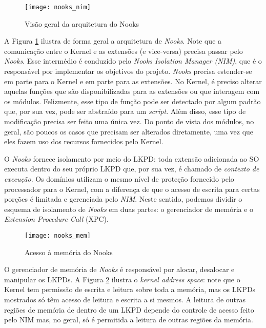 \begin{figure}[!h]
  \centering
  \texttt{[image: nooks\_nim]}
	\caption[Visão geral da arquitetura do Nooks]{Visão geral da arquitetura do Nooks \citep{nooks}}
  \label{fig:nooks_nim}
\end{figure}

A Figura \ref{fig:nooks_nim} ilustra de forma geral a arquitetura de
\emph{Nooks}. Note que a comunicação entre o Kernel e as extensões (e vice-versa)
precisa passar pelo \emph{Nooks}. Esse intermédio é conduzido pelo \emph{Nooks
Isolation Manager (NIM)}, que é o responsável por implementar os objetivos do
projeto. \emph{Nooks} precisa estender-se em parte para o Kernel e em parte
para as extensões. No Kernel, é preciso alterar aquelas funções que são
disponibilizadas para as extensões ou que interagem com os módulos. Felizmente,
esse tipo de função pode ser detectado por algum padrão que, por sua vez, pode
ser abstraído para um \emph{script}. Além disso, esse tipo de modificação precisa ser
feito uma única vez. Do ponto de vista dos módulos, no geral, são poucos os
casos que precisam ser alterados diretamente, uma vez que eles fazem uso dos
recursos fornecidos pelo Kernel. 

O \emph{Nooks} fornece isolamento por meio do LKPD: toda extensão
adicionada ao SO executa dentro do seu próprio LKPD que, por sua vez, é chamado
de \emph{contexto de execução}. Os domínios utilizam o mesmo nível de proteção
fornecido pelo processador para o Kernel, com a diferença de que o acesso de
escrita para certas porções é limitada e gerenciada pelo \emph{NIM}. Neste
sentido, podemos dividir o esquema de isolamento de \emph{Nooks} em duas partes:
o gerenciador de memória e o \emph{Extension Procedure Call} (XPC).

\begin{figure}[!h]
  \centering
  \texttt{[image: nooks\_mem]}
  \caption[Acesso à memória do Nooks]{Acesso à memória do Nooks \citep{nooks}}
  \label{fig:nooks_mem}
\end{figure}

O gerenciador de memória de \emph{Nooks} é responsável por alocar, desalocar e
manipular os LKPDs. A Figura \ref{fig:nooks_mem} ilustra o \textit{kernel
address space}: note que o Kernel tem permissão de escrita e leitura sobre toda
a memória, mas os LKPDs mostrados só têm acesso de leitura e escrita a si mesmos.
A leitura de outras regiões de memória de dentro de um LKPD depende do controle
de acesso feito pelo NIM mas, no geral, só é permitida a leitura de outras
regiões da memória.

